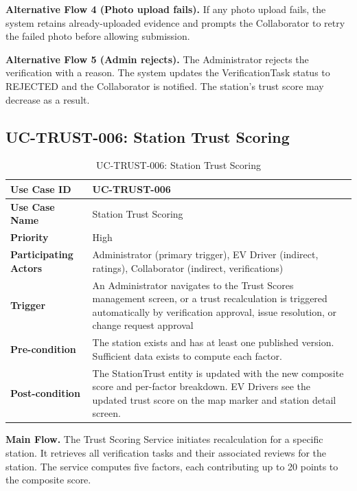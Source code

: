 \documentclass[../Main.tex]{subfiles}
\begin{document}
\textbf{Alternative Flow 4 (Photo upload fails).} If any photo upload fails, the system retains already-uploaded evidence and prompts the Collaborator to retry the failed photo before allowing submission.

\textbf{Alternative Flow 5 (Admin rejects).} The Administrator rejects the verification with a reason. The system updates the VerificationTask status to REJECTED and the Collaborator is notified. The station's trust score may decrease as a result.

\subsection{UC-TRUST-006: Station Trust Scoring}
\label{subsection:2.3.6}

\begin{table}[H]
\caption{UC-TRUST-006: Station Trust Scoring}
\label{table:uc-trust-006}
\begin{tabular}{|p{3.5cm}|p{12cm}|}
\hline
\textbf{Use Case ID} & UC-TRUST-006 \\ \hline
\textbf{Use Case Name} & Station Trust Scoring \\ \hline
\textbf{Priority} & High \\ \hline
\textbf{Participating Actors} & Administrator (primary trigger), EV Driver (indirect, ratings), Collaborator (indirect, verifications) \\ \hline
\textbf{Trigger} & An Administrator navigates to the Trust Scores management screen, or a trust recalculation is triggered automatically by verification approval, issue resolution, or change request approval \\ \hline
\textbf{Pre-condition} & The station exists and has at least one published version. Sufficient data exists to compute each factor. \\ \hline
\textbf{Post-condition} & The StationTrust entity is updated with the new composite score and per-factor breakdown. EV Drivers see the updated trust score on the map marker and station detail screen. \\ \hline
\end{tabular}
\end{table}

\textbf{Main Flow.} The Trust Scoring Service initiates recalculation for a specific station. It retrieves all verification tasks and their associated reviews for the station. The service computes five factors, each contributing up to 20 points to the composite score.
\end{document}
